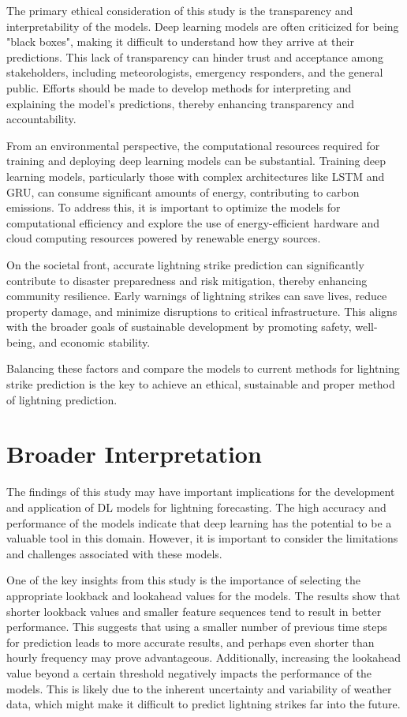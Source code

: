 The primary ethical consideration of this study is the transparency and interpretability of the models. Deep learning models are often criticized for being "black boxes", making it difficult to understand how they arrive at their predictions. This lack of transparency can hinder trust and acceptance among stakeholders, including meteorologists, emergency responders, and the general public. Efforts should be made to develop methods for interpreting and explaining the model's predictions, thereby enhancing transparency and accountability.

From an environmental perspective, the computational resources required for training and deploying deep learning models can be substantial. Training deep learning models, particularly those with complex architectures like LSTM and GRU, can consume significant amounts of energy, contributing to carbon emissions. To address this, it is important to optimize the models for computational efficiency and explore the use of energy-efficient hardware and cloud computing resources powered by renewable energy sources.

On the societal front, accurate lightning strike prediction can significantly contribute to disaster preparedness and risk mitigation, thereby enhancing community resilience. Early warnings of lightning strikes can save lives, reduce property damage, and minimize disruptions to critical infrastructure. This aligns with the broader goals of sustainable development by promoting safety, well-being, and economic stability.

Balancing these factors and compare the models to current methods for lightning strike prediction is the key to achieve an ethical, sustainable and proper method of lightning prediction.

\section{Broader Interpretation}

The findings of this study may have important implications for the development and application of DL models for lightning forecasting. The high accuracy and performance of the models indicate that deep learning has the potential to be a valuable tool in this domain. However, it is important to consider the limitations and challenges associated with these models.

One of the key insights from this study is the importance of selecting the appropriate lookback and lookahead values for the models. The results show that shorter lookback values and smaller feature sequences tend to result in better performance. This suggests that using a smaller number of previous time steps for prediction leads to more accurate results, and perhaps even shorter than hourly frequency may prove advantageous. Additionally, increasing the lookahead value beyond a certain threshold negatively impacts the performance of the models. This is likely due to the inherent uncertainty and variability of weather data, which might make it difficult to predict lightning strikes far into the future.

